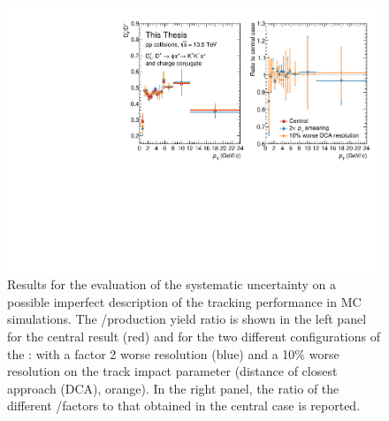 \begin{figure}[tb]
    \begin{center}
    \includegraphics[width=\textwidth]{Figures/Chapter 6/TrackTunerSyst.pdf}
    \caption{Results for the evaluation of the systematic uncertainty on a possible imperfect description of the tracking performance in MC simulations. The \ds/\dpl production yield ratio is shown in the left panel for the central result (red) and for the two different configurations of the : with a factor 2 worse \pt resolution (blue) and a 10\% worse resolution on the track impact parameter (distance of closest approach (DCA), orange). In the right panel, the ratio of the different \ds/\dpl factors to that obtained in the central case is reported.} 
    \label{fig:tracktuner} 
    \end{center}
\end{figure}
